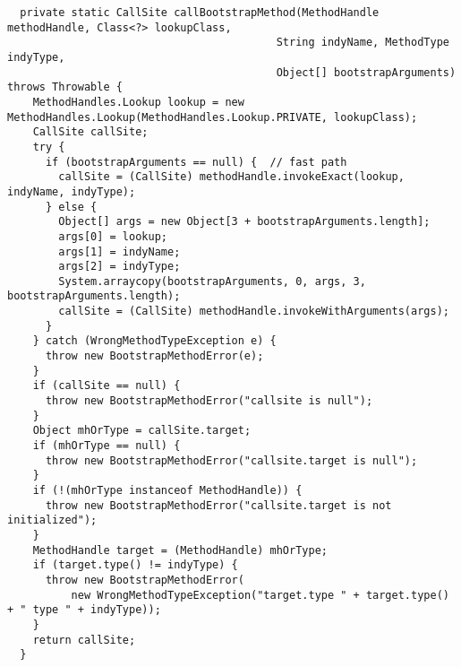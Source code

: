 {\tiny \begin{verbatim}
  private static CallSite callBootstrapMethod(MethodHandle methodHandle, Class<?> lookupClass,
                                          String indyName, MethodType indyType,
                                          Object[] bootstrapArguments) throws Throwable {
    MethodHandles.Lookup lookup = new MethodHandles.Lookup(MethodHandles.Lookup.PRIVATE, lookupClass);
    CallSite callSite;
    try {
      if (bootstrapArguments == null) {  // fast path
        callSite = (CallSite) methodHandle.invokeExact(lookup, indyName, indyType);
      } else {
        Object[] args = new Object[3 + bootstrapArguments.length];
        args[0] = lookup;
        args[1] = indyName;
        args[2] = indyType;
        System.arraycopy(bootstrapArguments, 0, args, 3, bootstrapArguments.length);
        callSite = (CallSite) methodHandle.invokeWithArguments(args);
      }
    } catch (WrongMethodTypeException e) {
      throw new BootstrapMethodError(e);
    }
    if (callSite == null) {
      throw new BootstrapMethodError("callsite is null");
    }
    Object mhOrType = callSite.target;
    if (mhOrType == null) {
      throw new BootstrapMethodError("callsite.target is null");
    }
    if (!(mhOrType instanceof MethodHandle)) {
      throw new BootstrapMethodError("callsite.target is not initialized");
    }
    MethodHandle target = (MethodHandle) mhOrType;
    if (target.type() != indyType) {
      throw new BootstrapMethodError(
          new WrongMethodTypeException("target.type " + target.type() + " type " + indyType));
    }
    return callSite;
  }
\end{verbatim} }